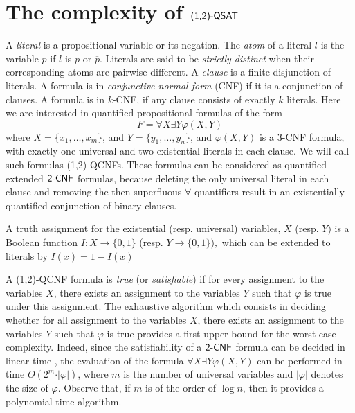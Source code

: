 \documentclass[aop,noinfoline]{imsart}
\newcommand{\onetwo}{(1,2)}
\newcommand{\onetwoqsat}{\mbox{\sf (1,2)-QSAT}}
\newcommand{\negate}[1]{\overline{#1}}
\newcommand{\onetwoqcnf}{\mbox{\sf \onetwo-QCNF}}
\newcommand{\twocnf}{\mbox{\sf 2-CNF}}
\begin{document}
\section{ The complexity of  $\onetwoqsat$}\label{sec:complexity}



 A \emph{literal}\/ is a propositional variable or its negation. The
\emph{atom}\/ of a literal $l$ is the variable $p$ if $l$ is $p$ or $\negate{p}$. Literals are said to be \emph{strictly distinct } when their corresponding atoms are pairwise different.
 A \emph{clause}\/ is a finite disjunction of
literals.   A formula is in \emph{conjunctive
normal
  form}\/ (CNF) if it is a conjunction of clauses.
A formula is in $k$-CNF, if any clause consists of exactly $k$
literals.  Here we are interested in quantified propositional 
formulas of the form
$$
F=\forall X \exists Y \varphi(X,Y)
$$
where $X=\{x_1,\ldots , x_m\}$, and $Y=\{y_1,\ldots , y_n\}$, and
$\varphi(X,Y)$ is a $3$-CNF formula, with exactly one universal
and two existential literals in each clause.  We will call such
formulas \onetwoqcnf{}s. These formulas can be considered as
quantified extended $\twocnf$ formulas, because deleting the only
universal literal in each clause and removing the then superfluous
$\forall$-quantifiers result in an existentially quantified
conjunction of binary clauses. 

A truth assignment for the existential (resp. universal) variables, $X$ (resp. $Y)$ is a Boolean function $I:X\rightarrow \{0,1\}$ (resp. $Y\rightarrow \{0,1\}),$ which can be extended   to literals by  
$I(\negate{x})=1-I(x)$


A \onetwoqcnf{} formula is {\it true} (or {\it satisfiable}) if for
every assignment  to the variables $X$, there exists an assignment to
the variables $Y$ such that $\varphi$ is true under this assignment.
The exhaustive algorithm which consists in deciding whether for
all assignment to the variables $X$, there exists an assignment to
the variables $Y$ such that $\varphi$ is true provides a first
upper bound for the worst case complexity. Indeed, since the
satisfiability of a $\twocnf$ formula can be decided in linear time
\cite{AspvallPT-79}, the evaluation of the formula $\forall X
\exists Y \varphi(X,Y)$ can be performed in time $O(2^m\cdot \vert
\varphi\vert)$, where $m$ is the number of universal variables and
$\vert \varphi\vert$ denotes the size of $\varphi$. Observe that,
if $m$ is of the order of $\log n$, then it
provides a polynomial time algorithm. 
\end{document}
